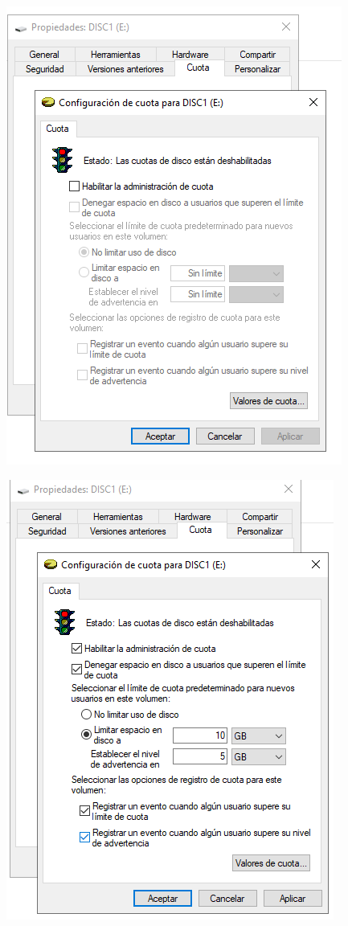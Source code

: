 \documentclass[
  a4paper,
]{article}
\begin{document}
\includegraphics{png/QuotaDisc1.png}

\includegraphics{png/QuotaDisc2.png}
\end{document}
